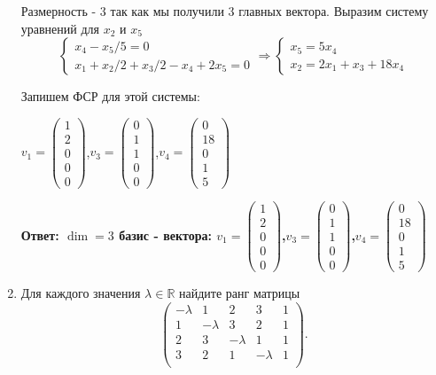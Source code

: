 \documentclass[a4paper,12pt]{article}
\begin{document}
\begin{enumerate}
Размерность - 3 так как мы получили 3 главных вектора.
Выразим систему уравнений для $x_2$ и $x_5$
$$\begin{cases}
    x_4-x_5/5=0\\
    x_1+x_2/2+x_3/2-x_4+2x_5=0
\end{cases} \Rightarrow \begin{cases}
    x_5=5x_4\\
    x_2 = 2x_1+x_3+18x_4
\end{cases}$$

Запишем ФСР для этой системы:

$v_1=\begin{pmatrix}1\\2\\0\\0\\0
\end{pmatrix}$,$v_3=\begin{pmatrix}0\\1\\1\\0\\0\end{pmatrix}$,$v_4=\begin{pmatrix}0\\18\\0\\1\\5\end{pmatrix}$


\textbf{Ответ: $\dim = 3$ базис - вектора: $v_1=\begin{pmatrix}1\\2\\0\\0\\0
\end{pmatrix}$,$v_3=\begin{pmatrix}0\\1\\1\\0\\0\end{pmatrix}$,$v_4=\begin{pmatrix}0\\18\\0\\1\\5\end{pmatrix}$}

\item Для каждого значения $\lambda\in \mathbb R$ найдите ранг матрицы
\[
\begin{pmatrix}
{-\lambda}&{1}&{2}&{3}&{1}\\
{1}&{-\lambda}&{3}&{2}&{1}\\
{2}&{3}&{-\lambda}&{1}&{1}\\
{3}&{2}&{1}&{-\lambda}&{1}\\
\end{pmatrix}.
\]


\end{enumerate}
\end{document}
